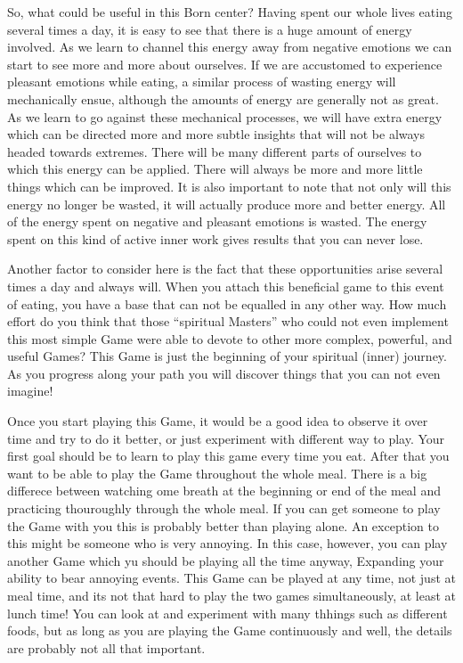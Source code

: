 \documentclass[12pt,letterpaper]{book}
\begin{document}
So, what could be useful in this Born center? Having spent our whole lives eating several times a day, it is easy to see that there is a huge amount of energy involved. As we learn to channel this energy away from negative emotions we can start to see more and more about ourselves. If we are accustomed to experience pleasant emotions while eating, a similar process of wasting energy will mechanically ensue, although the amounts of energy are generally not as great. As we learn to go against these mechanical processes, we will have extra energy which can be directed more and more subtle insights that will not be always headed towards extremes. There will be many different parts of ourselves to which this energy can be applied. There will always be more and more little things which can be improved. It is also important to note that not only will this energy no longer be wasted, it will actually produce more and better energy. All of the energy spent on negative and pleasant emotions is wasted. The energy spent on this kind of active inner work gives results that you can never lose.

Another factor to consider here is the fact that these opportunities arise several times a day and always will. When you attach this beneficial game to this event of eating, you have a base that can not be equalled in any other way. How much effort do you think that those  ``spiritual Masters'' who could not even implement this most simple Game were able to devote to other more complex, powerful, and useful Games? This Game is just the beginning of your spiritual (inner) journey. As you progress along your path you will discover things that you can not even imagine!

Once you start playing this Game, it would be a good idea to observe it over time and try to do it better, or just experiment with different way to play. Your first goal should be to learn to play this game every time you eat. After that you want to be able to play the Game throughout the whole meal. There is a big differece between watching ome breath at the beginning or end of the meal and practicing thouroughly through the whole meal. If you can get someone to play the Game with you this is probably better than playing alone. An exception to this might be someone who is very annoying. In this case, however, you can play another Game which yu should be playing all the time anyway, Expanding your ability to bear annoying events. This Game can be played at any time, not just at meal time, and its not that hard to play the two games simultaneously, at least at lunch time! You can look at and experiment with many thhings such as different foods, but as long as you are playing the Game continuously and well, the details are probably not all that important.
\end{document}

